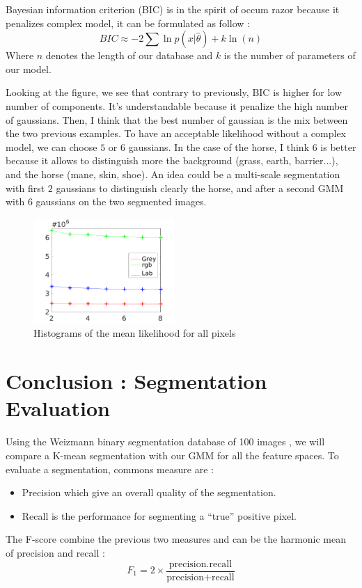 \documentclass[runningheads,a4paper]{llncs}
\begin{document}
Bayesian information criterion (BIC) \cite{wit2012all} is in the spirit of occum razor because it penalizes complex model, it can be formulated as follow :
\begin{equation}
BIC \approx -2\sum\ln p(x|\hat{\theta}) + k\ln(n)
\end{equation}
Where $n$ denotes the length of our database and $k$ is the number of parameters of our model.
\par Looking at the figure, we see that contrary to previously, BIC is higher for low number of components. It's understandable because it penalize the high number of gaussians.
Then, I think that the best number of gaussian is the mix between the two previous examples. To have an acceptable likelihood without a complex model, we can choose $5$ or $6$ gaussians. In the case of the horse, I think $6$ is better because it allows to distinguish more the background (grass, earth, barrier...), and the horse (mane, skin, shoe). An idea could be a multi-scale segmentation with first $2$ gaussians to distinguish clearly the horse, and after a second GMM with $6$ gaussians on the two segmented images.

\begin{figure}
\centering
\includegraphics[height=4cm]{Figures/bic}
\caption{Histograms of the mean likelihood for all pixels}
\end{figure}

\section{Conclusion : Segmentation Evaluation}

Using the Weizmann binary segmentation database of 100 images \cite{AlpertGBB07}, we will compare a K-mean segmentation with our GMM for all the feature spaces.
To evaluate a segmentation, commons measure are :
\begin{itemize}
\item Precision which give an overall quality of the segmentation.
\item Recall is the performance for segmenting a ``true'' positive pixel.
\end{itemize}
The F-score combine the previous two measures and can be the harmonic mean of precision and recall :
\begin{equation}
F_1 = 2\times\frac{\textrm{precision}.\textrm{recall}}{\textrm{precision}+\textrm{recall}}
\end{equation}
\end{document}
